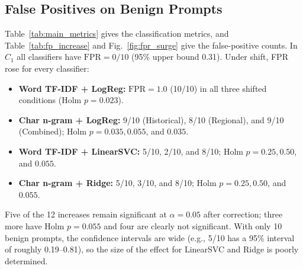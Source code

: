 \documentclass[conference]{IEEEtran}
\begin{document}
\subsection{False Positives on Benign Prompts}
Table~\ref{tab:main_metrics} gives the classification metrics, and Table~\ref{tab:fp_increase} and Fig.~\ref{fig:fpr_surge} give the false-positive counts. In $C_1$ all classifiers have $\text{FPR} = 0/10$ (95\% upper bound 0.31). Under shift, FPR rose for every classifier:
\begin{itemize}
    \item \textbf{Word TF-IDF + LogReg:} $\text{FPR} = 1.0$ (10/10) in all three shifted conditions (Holm $p = 0.023$).
    \item \textbf{Char n-gram + LogReg:} 9/10 (Historical), 8/10 (Regional), and 9/10 (Combined); Holm $p = 0.035, 0.055$, and $0.035$.
    \item \textbf{Word TF-IDF + LinearSVC:} 5/10, 2/10, and 8/10; Holm $p = 0.25, 0.50$, and $0.055$.
    \item \textbf{Char n-gram + Ridge:} 5/10, 3/10, and 8/10; Holm $p = 0.25, 0.50$, and $0.055$.
\end{itemize}
Five of the 12 increases remain significant at $\alpha = 0.05$ after correction; three more have Holm $p = 0.055$ and four are clearly not significant. With only 10 benign prompts, the confidence intervals are wide (e.g., 5/10 has a 95\% interval of roughly 0.19--0.81), so the size of the effect for LinearSVC and Ridge is poorly determined.
\end{document}
